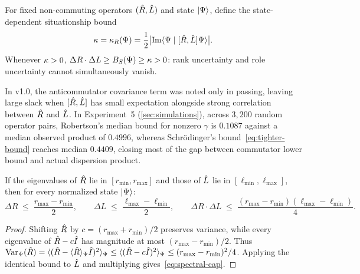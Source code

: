 \begin{principle}
\label{prin:uncertainty}
For fixed non-commuting operators $(\hat{R}, \hat{L})$ and state $\lvert \Psi \rangle$, define the
state-dependent situationship bound
\begin{equation}
  \kappa = \kappa_R(\Psi) = \frac{1}{2}\bigl\lvert \operatorname{Im}\langle \Psi \mid [\hat{R}, \hat{L}]\Psi \rangle \bigr\rvert.
  \label{eq:kappa-def}
\end{equation}
Whenever $\kappa > 0$, $\Delta R \cdot \Delta L \ge B_S(\Psi) \ge \kappa > 0$: rank
uncertainty and role uncertainty cannot simultaneously vanish.
\end{principle}

\begin{remark}
\label{rem:covariance-bound}
In v1.0, the anticommutator covariance term was noted only in passing, leaving large slack
when $[\hat{R},\hat{L}]$ has small expectation alongside strong correlation between $\hat{R}$ and $\hat{L}$.
In Experiment~5 (\cref{sec:simulations}), across $3{,}200$ random operator pairs, Robertson's
median bound for nonzero $\gamma$ is $0.1087$ against a median observed product of $0.4996$,
whereas Schr\"odinger's bound~\eqref{eq:tighter-bound} reaches median $0.4409$, closing most
of the gap between commutator lower bound and actual dispersion product.
\end{remark}

\begin{proposition}
\label{prop:popoviciu}
If the eigenvalues of $\hat{R}$ lie in $[r_{\min}, r_{\max}]$ and those of $\hat{L}$ lie in
$[\ell_{\min}, \ell_{\max}]$, then for every normalized state $\lvert \Psi \rangle$:
\begin{equation}
  \Delta R \;\le\; \frac{r_{\max} - r_{\min}}{2},
  \qquad
  \Delta L \;\le\; \frac{\ell_{\max} - \ell_{\min}}{2},
  \qquad
  \Delta R \cdot \Delta L \;\le\; \frac{(r_{\max} - r_{\min})(\ell_{\max} - \ell_{\min})}{4}.
  \label{eq:spectral-cap}
\end{equation}
\end{proposition}
\begin{proof}
Shifting $\hat{R}$ by $c = (r_{\max} + r_{\min})/2$ preserves variance, while every eigenvalue
of $\hat{R} - c\hat{I}$ has magnitude at most $(r_{\max} - r_{\min})/2$. Thus
$\operatorname{Var}_{\Psi}(\hat{R}) = \langle (\hat{R} - \langle \hat{R} \rangle_{\Psi}\hat{I})^2 \rangle_{\Psi}
\le \langle (\hat{R} - c\hat{I})^2 \rangle_{\Psi} \le (r_{\max} - r_{\min})^2 / 4$.
Applying the identical bound to $\hat{L}$ and multiplying gives~\eqref{eq:spectral-cap}.
\end{proof}

